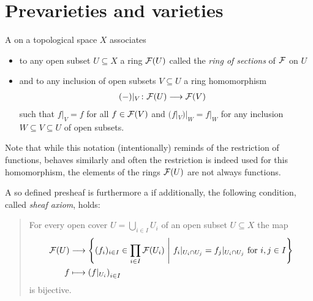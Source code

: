\documentclass[a4paper,parskip=half,numbers=enddot, DIV=12]{scrreprt}
\begin{document}
\section{Prevarieties and varieties}
\begin{defi}
    A  on a topological space $X$ associates 
    \begin{itemize}
    	\item to any open subset $U\subseteq X$ a ring $\mathcal{F}(U)$ called the \emph{ring of sections} of $\mathcal{F}$ on $U$
    	\item and to any inclusion of open subsets $V\subseteq U$ a ring homomorphism 
    	\begin{align*}
	    	(-)|_V\colon \mathcal{F}(U) &\longrightarrow \mathcal{F}(V)
    	\end{align*}
    	such that $f|_V = f$ for all $f\in\mathcal{F}(V)$ and $(f|_V)|_W = f|_W$ for any inclusion $W\subseteq V\subseteq U$ of open subsets.
    \end{itemize}  Note that while this notation (intentionally) reminds of the restriction of functions, behaves similarly and often the restriction is indeed used for this homomorphism, the elements of the rings $\mathcal{F}(U)$ are not always functions. 
    
    A so defined presheaf is furthermore a  if additionally, the following condition, called \emph{sheaf axiom}, holds:
    \begin{quote}
     For every open cover $U = \bigcup_{i\in I} U_i$ of an open subset $U\subseteq X$ the map
        \begin{align*}
			\mathcal{F}(U) &\longrightarrow \left\{(f_i)_{i\in I}\in \prod_{i\in I} \mathcal{F} (U_i)\ \middle|\  f_i|_{U_i\cap U_j} = f_j|_{U_i\cap U_j} \text{ for }i,j\in I\right\}\\
			f &\longmapsto \left(f|_{U_i}\right)_{i\in I}
        \end{align*}
        is bijective. 
    \end{quote}
\end{defi}
\end{document}
